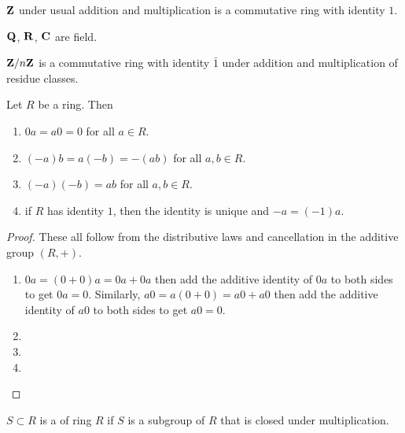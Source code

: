 \begin{figure}[H]
\centering
{}
\end{figure}

\begin{example}
$\mathbf Z$ under usual addition and multiplication is a commutative ring with identity $1$.

$\mathbf Q$, $\mathbf R$, $\mathbf C$ are field.

$\mathbf Z/n\mathbf Z$ is a commutative ring with identity $\bar{1}$ under addition and multiplication of residue classes.
\end{example}

\begin{proposition}
Let $R$ be a ring. Then
\begin{enumerate}[label=(\roman*)]
\item $0a=a0=0$ for all $a\in R$.
\item $(-a)b=a(-b)=-(ab)$ for all $a,b\in R$.
\item $(-a)(-b)=ab$ for all $a,b\in R$.
\item if $R$ has identity $1$, then the identity is unique and $-a=(-1)a$.
\end{enumerate}
\end{proposition}

\begin{proof}
These all follow from the distributive laws and cancellation in the additive group $(R,+)$.
\begin{enumerate}[label=(\roman*)]
\item $0a=(0+0)a=0a+0a$ then add the additive identity of $0a$ to both sides to get $0a=0$. Similarly, $a0=a(0+0)=a0+a0$ then add the additive identity of $a0$ to both sides to get $a0=0$.
\item 
\item 
\item 
\end{enumerate}
\end{proof}

\begin{definition}[Subring]
$S\subset R$ is a  of ring $R$ if $S$ is a subgroup of $R$ that is closed under multiplication.
\end{definition}


